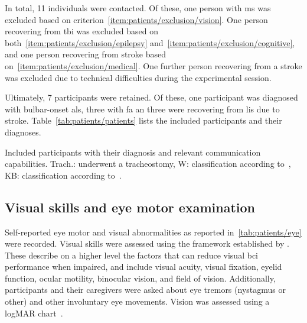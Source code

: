 \documentclass[twocolumn]{article}
\newcommand{\skill}{{\color{gdvGreen}{$\pmb{+}$}}}
\newcommand{\noskill}{{\color{gdvOrange}{$\pmb{-}$}}}
\newcommand{\snoskill}{{\color{gdvRed}{$\pmb{/}$}}}
\begin{document}
In total, 11 individuals were contacted. Of these, one person with
\ac{ms} was excluded based on criterion~\ref{item:patients/exclusion/vision}.
One person recovering from \ac{tbi} was excluded based on both~\ref{item:patients/exclusion/epilepsy}
and~\ref{item:patients/exclusion/cognitive}, and one person recovering from
stroke based on~\ref{item:patients/exclusion/medical}.
One further person recovering from a stroke was excluded due to technical
difficulties during the experimental session.

Ultimately, 7 participants were retained.
Of these, one participant was diagnosed with bulbar-onset \ac{als}, three with
\ac{fa} an three were recovering from \ac{lis} due to stroke.
Table~\ref{tab:patients/patients} lists the included participants and their
diagnoses.
\begin{table}
	\centering
	\footnotesize
	
	\caption{Included participants with their diagnosis and relevant communication
		capabilities.
		Trach.: underwent a tracheostomy, W: classification according
		to~\textcite{Wolpaw2006}, KB: classification according
		to~\textcite{Kuebler2008}.
	}
	\label{tab:patients/patients}
\end{table}

\subsection{Visual skills and eye motor examination}

Self-reported eye motor and visual abnormalities as reported in~\cref{tab:patients/eye}
were recorded.
Visual skills were assessed using the framework established by \textcite{FriedOken2020}.
These describe on a higher level the factors that can reduce visual \ac{bci} performance when impaired,
and include visual acuity, visual fixation, eyelid function, ocular motility,
binocular vision, and field of vision.
Additionally, participants and their caregivers were asked about eye tremors
(nystagmus or other) and other involuntary eye movements.
Vision was assessed using a logMAR chart~\cite{Bailey1976}.
\begin{table}
	
	\caption[Visual skills of the included participants.]{%
		Self-reported visual skills as defined by \textcite{FriedOken2020} of
		gaze-impaired participants included in this study.
		\skill\ skilled, \noskill\ impaired, \snoskill\ severely impaired.
		Visual acuity was assessed using the logMAR scale (lower is better).}
	\label{tab:patients/eye}
\end{table}
\end{document}

